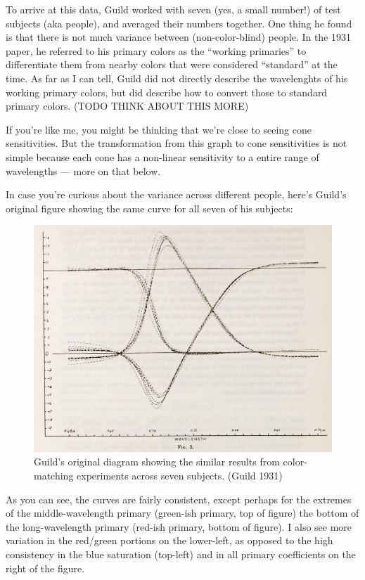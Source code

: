 \documentclass[
]{article}
\begin{document}
To arrive at this data, Guild worked with seven (yes, a small number!)
of test subjects (aka people), and averaged their numbers together. One
thing he found is that there is not much variance between
(non-color-blind) people. In the 1931 paper, he referred to his primary
colors as the ``working primaries'' to differentiate them from nearby
colors that were considered ``standard'' at the time. As far as I can
tell, Guild did not directly describe the wavelenghts of his working
primary colors, but did describe how to convert those to standard
primary colors. (TODO THINK ABOUT THIS MORE)

If you're like me, you might be thinking that we're close to seeing cone
sensitivities. But the transformation from this graph to cone
sensitivities is not simple because each cone has a non-linear
sensitivity to a entire range of wavelengths --- more on that below.

In case you're curious about the variance across different people,
here's Guild's original figure showing the same curve for all seven of
his subjects:

\begin{figure}
\centering
\begin{center}\includegraphics[width=1.0\textwidth]{img/Guild_different_subjects.jpg}\end{center}
\caption{Guild's original diagram showing the similar results from
color-matching experiments across seven subjects. (Guild 1931)}
\end{figure}

As you can see, the curves are fairly consistent, except perhaps for the
extremes of the middle-wavelength primary (green-ish primary, top of
figure) the bottom of the long-wavelength primary (red-ish primary,
bottom of figure). I also see more variation in the red/green portions
on the lower-left, as opposed to the high consistency in the blue
saturation (top-left) and in all primary coefficients on the right of
the figure.
\end{document}
